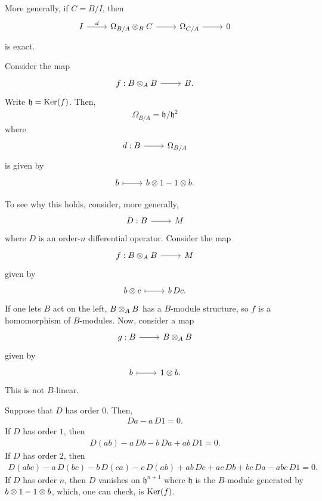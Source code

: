 \documentclass [11 pt, oneside] {article}
\begin{document}
More generally, if $C=B/I$, then
\[
\begin{tikzcd}
	I\ar[r,"d"]&\Omega_{B/A}\tensor_B C\ar[r]&\Omega_{C/A} \ar[r]&0
\end{tikzcd}
\]
is exact.

Consider the map
\[
\begin{tikzcd}
	f:B\tensor_A B\ar[r]& B.
\end{tikzcd}
\]
Write $\mathfrak{h} = \operatorname{Ker} (f)$. Then,
\begin{align*}
	\Omega_{B/A} = \mathfrak{h}/\mathfrak{h}^2
\end{align*}
where
\[
\begin{tikzcd}
	d: B\ar[r]& \Omega_{B/A}
\end{tikzcd}
\]
is given by
\[
\begin{tikzcd}
	b\ar[r,mapsto] & b\tensor 1 - 1\tensor b.
\end{tikzcd}
\]

To see why this holds, consider, more generally,
\[
\begin{tikzcd}
	D : B\ar[r]&M
\end{tikzcd}
\]
where $D$ is an order-$n$ differential operator.
Consider the map
\[
\begin{tikzcd}
	f: B\tensor_A B\ar[r]& M
\end{tikzcd}
\]
given by 
\[
\begin{tikzcd}
	b\tensor c \ar[r,mapsto] & b\, Dc.
\end{tikzcd}
\]
If one lets $B$ act on the left, $B\otimes_A B$ has a $B$-module structure, so $f$ is a homomorphism of $B$-modules. 
Now, consider a map
\[
\begin{tikzcd}
	g: B\ar[r] & B\tensor_A B
\end{tikzcd}
\]
given by 
\[
\begin{tikzcd}
	b\ar[r,mapsto] & 1\tensor b.
\end{tikzcd}
\]
This is not $B$-linear.

Suppose that $D$ has order $0$. Then,
\begin{align*}
	Da - a\,D1 = 0.
\end{align*}
If $D$ has order $1$, then
\begin{align*}
	D(ab) - a\, Db - b\, D a + ab\,  D1=0.
\end{align*}
If $D$ has order $2$, then
\begin{align*}
	D(abc) - a \,D (bc) - b\, D(ca) - c\, D (ab) + ab \, Dc + ac \, Db + bc \, Da - abc\,  D1=0.
\end{align*}
If $D$ has order $n$, then $D$ vanishes on $\mathfrak{h}^{n+1}$ where $\mathfrak{h}$ is the $B$-module generated by $b\otimes 1 - 1\otimes b$, which, one can check, is $\operatorname{Ker}(f)$.
\end{document}

